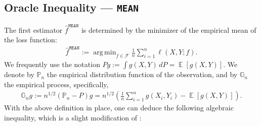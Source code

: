 \documentclass[12pt]{article}
\DeclareMathOperator*{\argmin}{arg\,min}
\DeclareMathOperator*{\E}{\mathbb{E}}
\begin{document}
\begin{appendices}
\subsection{Oracle Inequality --- \texttt{MEAN}}
The first estimator $\widehat f^{\mathtt{MEAN}}$ is determined by the minimizer of the empirical mean of the loss function: 
\begin{align}\label{eq:LSE-estimator}
	\widehat f^{\mathtt{MEAN}} := \argmin_{f \in \mathcal{F}} \frac{1}{n}\sum_{i =1}^n \ell(X,Y; f).
\end{align}
We frequently use the notation $P g := \int g(X,Y) \, dP = \E[g(X,Y)]$. We denote by $\mathbb{P}_n$ the empirical distribution function of the observation, and by $\mathbb{G}_n$ the empirical process, specifically,
\begin{align}
	\mathbb{G}_n g := n^{1/2}\left(\mathbb{P}_n - P\right)g = n^{1/2}\left(\frac{1}{n}\sum_{i=1}^n g(X_i, Y_i) - \E[g(X, Y)]\right).
\end{align}
With the above definition in place, one can deduce the following algebraic inequality, which is a slight modification of \citep[Lemma~2.1]{vaart2006oracle}:


\end{appendices}
\end{document}
